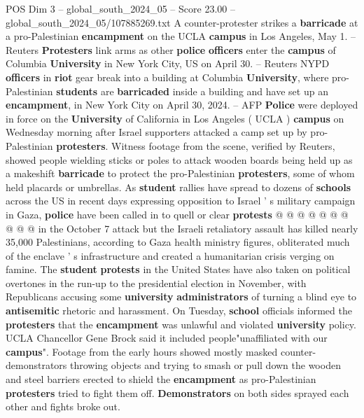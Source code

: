 \begin{textsample}{POS Dim 3 – global\_south\_2024\_05 – Score 23.00 – global\_south\_2024\_05/107885269.txt}  \label{ex:f3_pos_104}
A counter-protester strikes a \textbf{barricade} at a pro-Palestinian \textbf{encampment} on the UCLA \textbf{campus} in Los Angeles, May 1. -- Reuters \textbf{Protesters} link arms as other \textbf{police} \textbf{officers} enter the \textbf{campus} of Columbia \textbf{University} in New York City, US on April 30. -- Reuters NYPD \textbf{officers} in \textbf{riot} gear break into a building at Columbia \textbf{University}, where pro-Palestinian \textbf{students} are \textbf{barricaded} inside a building and have set up an \textbf{encampment}, in New York City on April 30, 2024. -- AFP \textbf{Police} were deployed in force on the \textbf{University} of California in Los Angeles ( UCLA ) \textbf{campus} on Wednesday morning after Israel supporters attacked a camp set up by pro-Palestinian \textbf{protesters}.
Witness footage from the scene, verified by Reuters, showed people wielding sticks or poles to attack wooden boards being held up as a makeshift \textbf{barricade} to protect the pro-Palestinian \textbf{protesters}, some of whom held placards or umbrellas.
As \textbf{student} rallies have spread to dozens of \textbf{schools} across the US in recent days expressing opposition to Israel ' s military campaign in Gaza, \textbf{police} have been called in to quell or clear \textbf{protests} @ @ @ @ @ @ @ @ @ @ in the October 7 attack but the Israeli retaliatory assault has killed nearly 35,000 Palestinians, according to Gaza health ministry figures, obliterated much of the enclave ' s infrastructure and created a humanitarian crisis verging on famine.
The \textbf{student} \textbf{protests} in the United States have also taken on political overtones in the run-up to the presidential election in November, with Republicans accusing some \textbf{university} \textbf{administrators} of turning a blind eye to \textbf{antisemitic} rhetoric and harassment.
On Tuesday, \textbf{school} officials informed the \textbf{protesters} that the \textbf{encampment} was unlawful and violated \textbf{university} policy.
UCLA Chancellor Gene Brock said it included people"unaffiliated with our \textbf{campus}".
Footage from the early hours showed mostly masked counter-demonstrators throwing objects and trying to smash or pull down the wooden and steel barriers erected to shield the \textbf{encampment} as pro-Palestinian \textbf{protesters} tried to fight them off. \textbf{Demonstrators} on both sides sprayed each other and fights broke out.

\end{textsample}
